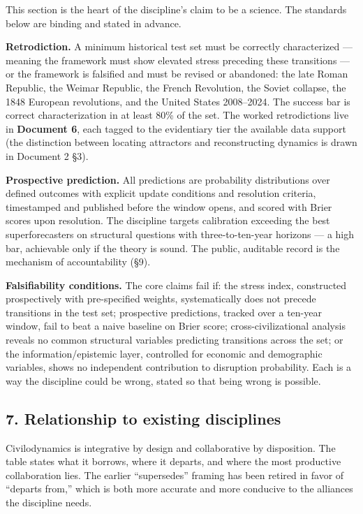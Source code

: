 \documentclass[
]{article}
\begin{document}
This section is the heart of the discipline's claim to be a science. The
standards below are binding and stated in advance.

\textbf{Retrodiction.} A minimum historical test set must be correctly
characterized --- meaning the framework must show elevated stress
preceding these transitions --- or the framework is falsified and must
be revised or abandoned: the late Roman Republic, the Weimar Republic,
the French Revolution, the Soviet collapse, the 1848 European
revolutions, and the United States 2008--2024. The success bar is
correct characterization in at least 80\% of the set. The worked
retrodictions live in \textbf{Document 6}, each tagged to the
evidentiary tier the available data support (the distinction between
locating attractors and reconstructing dynamics is drawn in Document 2
§3).

\textbf{Prospective prediction.} All predictions are probability
distributions over defined outcomes with explicit update conditions and
resolution criteria, timestamped and published before the window opens,
and scored with Brier scores upon resolution. The discipline targets
calibration exceeding the best superforecasters on structural questions
with three-to-ten-year horizons --- a high bar, achievable only if the
theory is sound. The public, auditable record is the mechanism of
accountability (§9).

\textbf{Falsifiability conditions.} The core claims fail if: the stress
index, constructed prospectively with pre-specified weights,
systematically does not precede transitions in the test set; prospective
predictions, tracked over a ten-year window, fail to beat a naive
baseline on Brier score; cross-civilizational analysis reveals no common
structural variables predicting transitions across the set; or the
information/epistemic layer, controlled for economic and demographic
variables, shows no independent contribution to disruption probability.
Each is a way the discipline could be wrong, stated so that being wrong
is possible.

\subsection{7. Relationship to existing
disciplines}\label{relationship-to-existing-disciplines}

Civilodynamics is integrative by design and collaborative by
disposition. The table states what it borrows, where it departs, and
where the most productive collaboration lies. The earlier ``supersedes''
framing has been retired in favor of ``departs from,'' which is both
more accurate and more conducive to the alliances the discipline needs.
\end{document}
